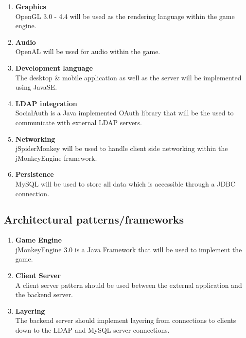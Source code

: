 \documentclass[letterpaper]{article}
\begin{document}
				\begin{enumerate}					
					\item \textbf{Graphics}
					\\OpenGL 3.0 - 4.4 will be used as the rendering language within the game engine.
					
					\item \textbf{Audio}
					\\OpenAL will be used for audio within the game.
					
					\item \textbf{Development language}
					\\The desktop \& mobile application as well as the server will be implemented using JavaSE.
					
					\item \textbf{LDAP integration}
					\\SocialAuth is a Java implemented OAuth library that will be the used to communicate with external LDAP servers.
					
					\item \textbf{Networking}
					\\jSpiderMonkey will be used to handle client side networking within the jMonkeyEngine framework.
					
					\item \textbf{Persistence}
					\\MySQL will be used to store all data which is accessible through a JDBC connection.
				\end{enumerate}
				
			\subsection*{Architectural patterns/frameworks}
			\vspace{0.1in}
			
				\begin{enumerate}
					\item \textbf{Game Engine}
					\\jMonkeyEngine 3.0 is a Java Framework that will be used to implement the game.
					
					\item \textbf{Client Server}
					\\A client server pattern should be used between the external application and the backend server.
					
					\item \textbf{Layering}
					\\The backend server should implement layering from connections to clients down to the LDAP and MySQL server connections.
				\end{enumerate}
			
		\vspace{0.2in}
		
\end{document}
